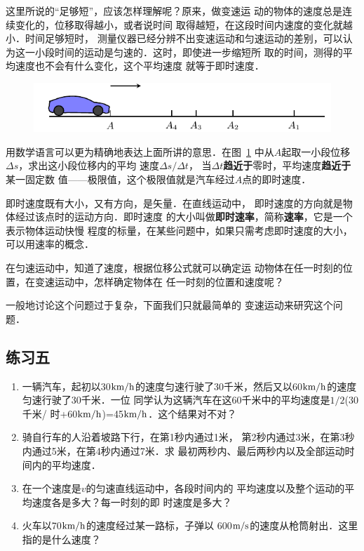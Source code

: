 这里所说的“足够短”，应该怎样理解呢？原来，做变速运
动的物体的速度总是连续变化的，位移取得越小，或者说时间
取得越短，在这段时间内速度的变化就越小．时间足够短时，
测量仪器已经分辨不出变速运动和匀速运动的差别，可以认
为这一小段时间的运动是匀速的．这时，即使进一步缩短所
取的时间，测得的平均速度也不会有什么变化，这个平均速度
就等于即时速度．

\begin{figure}[htp]
    \centering
    \includegraphics{fig/A/2-14.pdf}
    \caption{}\label{fig_A_2-14}
\end{figure}

用数学语言可以更为精确地表达上面所讲的意思．在图~\ref{fig_A_2-14} 
中从$A$起取一小段位移$\Delta s$，求出这小段位移内的平均
速度$\Delta s/\Delta t$， 当$\Delta t$\textbf{趋近于}零时，平均速度\textbf{趋近于}某一固定数
值——极限值，这个极限值就是汽车经过$A$点的即时速度．

    即时速度既有大小，又有方向，是矢量．在直线运动中，
即时速度的方向就是物体经过该点时的运动方向．即时速度
的大小叫做\textbf{即时速率}，简称\textbf{速率}，它是一个表示物体运动快慢
程度的标量，在某些问题中，如果只需考虑即时速度的大小，
可以用速率的概念．

    在匀速运动中，知道了速度，根据位移公式就可以确定运
动物体在任一时刻的位置，在变速运动中，怎样确定物体在
任一时刻的位置和速度呢？

    一般地讨论这个问题过于复杂，下面我们只就最简单的
变速运动来研究这个问题．

\subsection*{练习五}

\begin{enumerate}
    \item 一辆汽车，起初以30$\text{km}/\text{h}$的速度匀速行驶了30千米，然后又以60$\text{km}/\text{h}$的速度匀速行驶了30千米．一位
    同学认为这辆汽车在这60千米中的平均速度是$1/2$(30千米/
    时+60$\text{km}/\text{h}$)=45$\text{km}/\text{h}$．这个结果对不对？
    \item 骑自行车的人沿着坡路下行，在第1秒内通过1米，
    第2秒内通过3米，在第3秒内通过5米，在第4秒内通过7米．求
    最初两秒内、最后两秒内以及全部运动时间内的平均速度．
    \item 在一个速度是$v$的匀速直线运动中，各段时间内的
    平均速度以及整个运动的平均速度各是多大？每一时刻的即
    时速度是多大？
    \item 火车以70$\text{km}/\text{h}$的速度经过某一路标，子弹以
    600$\text{m}/\text{s}$的速度从枪筒射出．这里指的是什么速度？
    
\end{enumerate}


